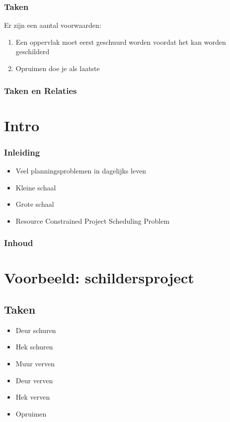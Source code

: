 \documentclass{beamer}
\theoremstyle{definition}
\newcommand{\inputtikz}[1]{}
\begin{document}
\begin{frame}
    	\frametitle{Taken}
   	Er zijn een aantal voorwaarden:
	\begin{enumerate}
	    	\item Een oppervlak moet eerst geschuurd worden voordat het kan worden geschilderd
		\item Opruimen doe je als laatste
	\end{enumerate}
\end{frame}

\begin{frame}
	\frametitle{Taken en Relaties}
	\vspace{-1em}
	\begin{figure}[ht]
		\makebox[\textwidth][c]{\resizebox{.8\paperwidth}{!}{
			\inputtikz{activity_graph_simple}
		}}
		\vspace{-1em}
	\end{figure}
\end{frame}

\section*{Intro}
\begin{frame}
  \frametitle{Inleiding}
  \begin{itemize}
		\item Veel planningsproblemen in dagelijks leven
		\item Kleine schaal
		\item Grote schaal
		\item Resource Constrained Project Scheduling Problem
  \end{itemize}
\end{frame}

\begin{frame}
    \frametitle{Inhoud}
    \tableofcontents
\end{frame}

\section[Schildersproject]{Voorbeeld: schildersproject}

\subsection{Taken}

\begin{frame}
	\begin{itemize}
	
		\item Deur schuren
		\item Hek schuren
		\item<2-> Muur verven
		\item<2-> Deur verven
		\item<2-> Hek verven
		\item<3-> Opruimen
	\end{itemize}
\end{frame}
\end{document}
